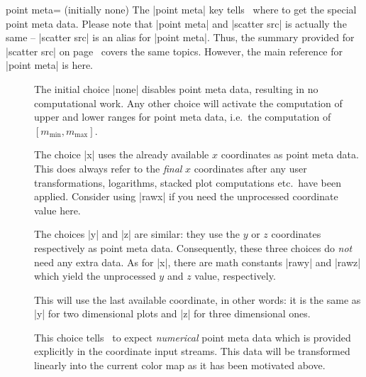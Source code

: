 \begin{codeexample}[]
\end{codeexample}

\begin{pgfplotskey}{point meta= (initially none)}
	\label{pgfplots:pointmeta}
	The |point meta| key tells \PGFPlots\ where to get the special point meta data. Please note that |point meta| and |scatter src| is actually the same -- |scatter src| is an alias for |point meta|. Thus, the summary provided for |scatter src| on page~\pageref{pgfplots:scatter:src} covers the same topics. However, the main reference for |point meta| is here.
	
	\begin{description}
		\item[] The initial choice |none| disables point meta data, resulting in no computational work. Any other choice will activate the computation of upper and lower ranges for point meta data, i.e.\ the computation of $[m_{\text{min}},m_{\text{max}}]$. 

		\item[] The choice |x| uses the already available $x$ coordinates as point meta data. This does always refer to the \emph{final} $x$ coordinates after any user transformations, logarithms, stacked plot computations etc.\ have been applied. Consider using |rawx| if you need the unprocessed coordinate value here.

		\item[]
		\item[]
			 The choices |y| and |z| are similar: they use the $y$ or $z$ coordinates respectively as point meta data. Consequently, these three choices do \emph{not} need any extra data. As for |x|, there are math constants |rawy| and |rawz| which yield the unprocessed $y$ and $z$ value, respectively.

		\item[] This will use the last available coordinate, in other words: it is the same as |y| for two dimensional plots and |z| for three dimensional ones.

		\item[] This choice tells \PGFPlots\ to expect \emph{numerical} point meta data which is provided explicitly in the coordinate input streams. This data will be transformed linearly into the current color map as it has been motivated above.
		

\end{description}
\end{pgfplotskey}
